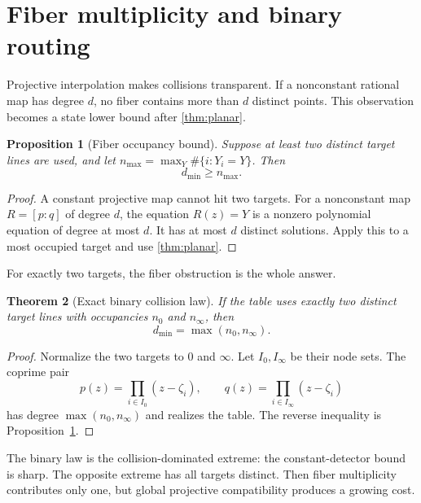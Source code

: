 \documentclass[11pt]{article}
\newtheorem{theorem}{Theorem}[section]
\newtheorem{proposition}[theorem]{Proposition}
\theoremstyle{definition}\newtheorem{definition}[theorem]{Definition}\newtheorem{example}[theorem]{Example}
\theoremstyle{remark}\newtheorem{remark}[theorem]{Remark}\newtheorem{limitation}[theorem]{Limitation}
\begin{document}
\section{Fiber multiplicity and binary routing}

Projective interpolation makes collisions transparent.  If a nonconstant
rational map has degree $d$, no fiber contains more than $d$ distinct points.
This observation becomes a state lower bound after \cref{thm:planar}.

\begin{proposition}[Fiber occupancy bound]\label{prop:fiber}
Suppose at least two distinct target lines are used, and let
$n_{\max}=\max_Y\#\{i:Y_i=Y\}$.  Then
\[
                              d_{\min}\ge n_{\max}.
\]
\end{proposition}

\begin{proof}
A constant projective map cannot hit two targets.  For a nonconstant map
$R=[p:q]$ of degree $d$, the equation $R(z)=Y$ is a nonzero polynomial equation
of degree at most $d$.  It has at most $d$ distinct solutions.  Apply this to a
most occupied target and use \cref{thm:planar}.
\end{proof}

For exactly two targets, the fiber obstruction is the whole answer.

\begin{theorem}[Exact binary collision law]\label{thm:binary}
If the table uses exactly two distinct target lines with occupancies $n_0$ and
$n_\infty$, then
\begin{equation}\label{eq:binary}
                         d_{\min}=\max(n_0,n_\infty).
\end{equation}
\end{theorem}

\begin{proof}
Normalize the two targets to $0$ and $\infty$.  Let $I_0,I_\infty$ be their node
sets.  The coprime pair
\[
 p(z)=\prod_{i\in I_0}(z-\zeta_i),\qquad
 q(z)=\prod_{i\in I_\infty}(z-\zeta_i)
\]
has degree $\max(n_0,n_\infty)$ and realizes the table.  The reverse inequality
is Proposition~\ref{prop:fiber}.
\end{proof}

The binary law is the collision-dominated extreme: the constant-detector bound
is sharp.  The opposite extreme has all targets distinct.  Then fiber
multiplicity contributes only one, but global projective compatibility produces
a growing cost.
\end{document}
